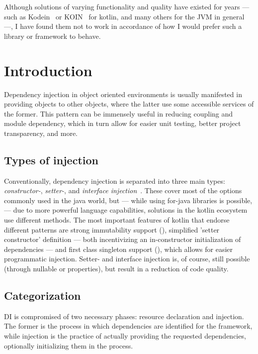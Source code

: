 Although solutions of varying functionality and quality have existed for years --- such as Kodein~\cite{Kodein} or KOIN~\cite{KOIN} for kotlin, and many others for the JVM in general~\cite{JavaCdi} ---, I have found them not to work in accordance of how I would prefer such a library or framework to behave.

	\section{Introduction}
	
	Dependency injection in object oriented environments is usually manifested in providing objects to other objects, where the latter use some accessible services of the former. This pattern can be immensely useful in reducing coupling and module dependency, which in turn allow for easier unit testing, better project transparency, and more.
	
		\subsection*{Types of injection}
		
		Conventionally, dependency injection is separated into three main types: \emph{constructor-}, \emph{setter-}, and \emph{interface injection}~\cite{DiTypes}. These cover most of the options commonly used in the java world, but --- while using for-java libraries is possible, --- due to more powerful language capabilities, solutions in the kotlin ecosystem use different methods. The most important features of kotlin that endorse different patterns are strong immutability support (), simplified 'setter constructor' definition --- both incentivizing an in-constructor initialization of dependencies --- and first class singleton support (), which allows for easier programmatic injection. Setter- and interface injection is, of course, still possible (through nullable or  properties), but result in a reduction of code quality.
		
		\subsection*{Categorization}
	
		DI is compromised of two necessary phases: resource declaration and injection. The former is the process in which dependencies are identified for the framework, while injection is the practice of actually providing the requested dependencies, optionally initializing them in the process.
		
